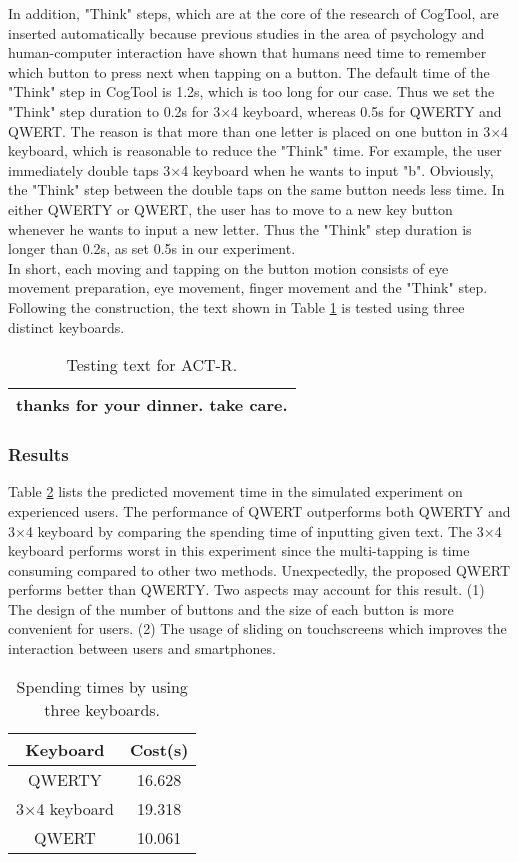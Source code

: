 \documentclass{singlecol-new}
\theoremstyle{TH}{
\newtheorem{lemma}{Lemma}
\newtheorem{theorem}[lemma]{Theorem}
\newtheorem{corrolary}[lemma]{Corrolary}
\newtheorem{conjecture}[lemma]{Conjecture}
\newtheorem{proposition}[lemma]{Proposition}
\newtheorem{claim}[lemma]{Claim}
\newtheorem{stheorem}[lemma]{Wrong Theorem}
\newtheorem{algorithm}{Algorithm}
}
\theoremstyle{THrm}{
\newtheorem{definition}{Definition}[section]
\newtheorem{question}{Question}[section]
\newtheorem{remark}{Remark}
\newtheorem{scheme}{Scheme}
}
\theoremstyle{THhit}{
\newtheorem{case}{Case}[section]
}
\begin{document}
In addition, "Think" steps, which are at the core of the research of CogTool, are inserted automatically because previous studies in the area of psychology and human-computer interaction have shown that humans need time to remember which button to press next when tapping on a button. The default time of the "Think" step in CogTool is 1.2s, which is too long for our case. Thus we set the "Think" step duration to 0.2s for 3$\times$4 keyboard, whereas 0.5s for QWERTY and QWERT. The reason is that more than one letter is placed on one button in 3$\times$4 keyboard, which is reasonable to reduce the "Think" time. For example, the user immediately double taps 3$\times$4 keyboard when he wants to input "b". Obviously, the "Think" step between the double taps on the same button needs less time. In either QWERTY or QWERT, the user has to move to a new key button whenever he wants to input a new letter. Thus the "Think" step duration is longer than 0.2s, as set 0.5s in our experiment. \\

In short, each moving and tapping on the button motion consists of eye movement preparation, eye movement, finger movement and the "Think" step. Following the construction, the text shown in Table \ref{tab.box} is tested using three distinct keyboards. \\
\begin{table}
\centering
\caption{Testing text for ACT-R.}\label{tab.box}
\begin{tabular}{|c|}
  \hline
thanks for your dinner. take care. \\
  \hline
\end{tabular}
\end{table}

\subsubsection{Results}

Table \ref{tab.res} lists the predicted movement time in the simulated experiment on experienced users. The performance of QWERT outperforms both QWERTY and 3$\times$4 keyboard by comparing the spending time of inputting given text. The 3$\times$4 keyboard performs worst in this experiment since the multi-tapping is time consuming compared to other two methods. Unexpectedly, the proposed QWERT performs better than QWERTY. Two aspects may account for this result. (1) The design of the number of buttons and the size of each button is more convenient for users. (2) The usage of sliding on touchscreens which improves the interaction between users and smartphones. \\
\begin{table}
\centering
\caption{Spending times by using three keyboards.}\label{tab.res}
\begin{tabular}{cc}
  \hline
Keyboard & Cost(s) \\
  \hline
  QWERTY & 16.628 \\
  3$\times$4 keyboard & 19.318 \\
  QWERT & 10.061 \\
  \hline
\end{tabular}
\end{table}
\end{document}
